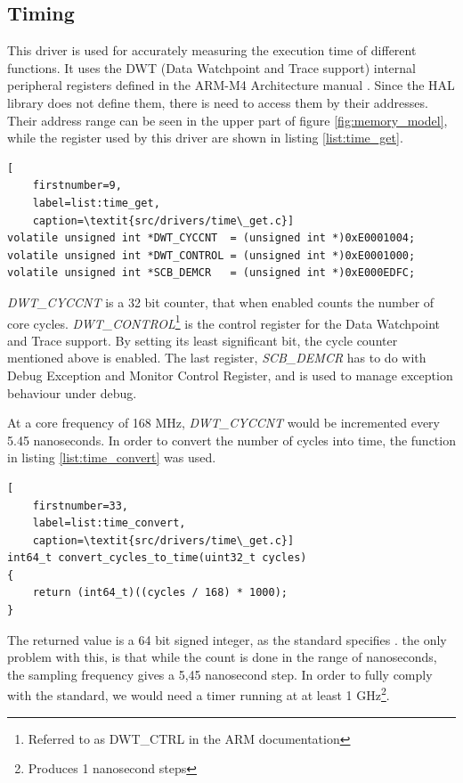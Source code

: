 \subsection{Timing}
This driver is used for accurately measuring the execution time of different
functions. It uses the DWT (Data Watchpoint and Trace support)
internal peripheral registers defined in the ARM-M4 Architecture 
manual \cite{arm_architecture}.
Since the HAL library does not define them, there is need to access them
by their addresses. Their address range can be seen in the upper part of
figure \ref{fig:memory_model}, while the register used by this driver are 
shown in listing \ref{list:time_get}.

\begin{minipage}{\linewidth}
\begin{lstlisting}[
	firstnumber=9,
	label=list:time_get,
	caption=\textit{src/drivers/time\_get.c}]
volatile unsigned int *DWT_CYCCNT  = (unsigned int *)0xE0001004;
volatile unsigned int *DWT_CONTROL = (unsigned int *)0xE0001000;
volatile unsigned int *SCB_DEMCR   = (unsigned int *)0xE000EDFC;
\end{lstlisting}
\end{minipage}

\textit{DWT\_CYCCNT} is a 32 bit counter, that when enabled counts
the number of core cycles. \textit{DWT\_CONTROL}\footnote{Referred to
as DWT\_CTRL in the ARM documentation} is the control register for the
Data Watchpoint and Trace support. By setting its least significant bit,
the cycle counter mentioned above is enabled. The last register,
\textit{SCB\_DEMCR} has to do with Debug Exception and Monitor Control Register,
and is used to manage exception behaviour under debug.

At a core frequency of 168 MHz, \textit{DWT\_CYCCNT} would be
incremented every 5.45 nanoseconds. In order to convert the number 
of cycles into time, the function in listing \ref{list:time_convert}
was used.

\begin{minipage}{\linewidth}
\begin{lstlisting}[
	firstnumber=33,
	label=list:time_convert,
	caption=\textit{src/drivers/time\_get.c}]
int64_t convert_cycles_to_time(uint32_t cycles)
{
    return (int64_t)((cycles / 168) * 1000);
}
\end{lstlisting}
\end{minipage}

The returned value is a 64 bit signed integer, as the \arinc{} standard 
specifies \cite{arinc_time}. the only problem with this, is that while 
the count is done in the range of nanoseconds, the sampling frequency
gives a 5,45 nanosecond step. In order to fully comply with the standard,
we would need a timer running at at least 1 GHz\footnote{Produces 1
 nanosecond steps}.

